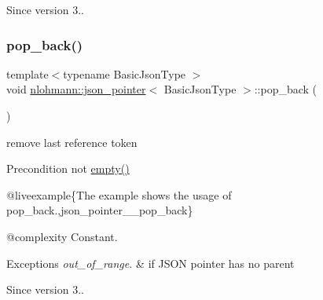 \begin{DoxySince}{Since}
version 3.. 
\end{DoxySince}
\mbox{\label{classnlohmann_1_1json__pointer_a4b1ee4d511ca195bed896a3da47e264c}} 
\subsubsection{\texorpdfstring{pop\_back()}{pop\_back()}}
{\footnotesize\ttfamily template$<$typename Basic\+Json\+Type $>$ \\
void \mbox{\hyperlink{classnlohmann_1_1json__pointer}{nlohmann\+::json\+\_\+pointer}}$<$ Basic\+Json\+Type $>$\+::pop\+\_\+back (\begin{DoxyParamCaption}{ }\end{DoxyParamCaption})\hspace{0.3cm}{\ttfamily [inline]}}



remove last reference token 

\begin{DoxyPrecond}{Precondition}
not {\ttfamily \mbox{\hyperlink{classnlohmann_1_1json__pointer_a649252bda4a2e75a0915b11a25d8bcc3}{empty()}}}
\end{DoxyPrecond}
@liveexample\{The example shows the usage of {\ttfamily pop\+\_\+back}.,json\+\_\+pointer\+\_\+\+\_\+pop\+\_\+back\}

@complexity Constant.


\begin{DoxyExceptions}{Exceptions}
{\em out\+\_\+of\+\_\+range.} & if J\+S\+ON pointer has no parent\\
\hline
\end{DoxyExceptions}
\begin{DoxySince}{Since}
version 3.. 
\end{DoxySince}
\mbox{\label{classnlohmann_1_1json__pointer_a697d12b5bd6205f8866691b166b7c7dc}} 
